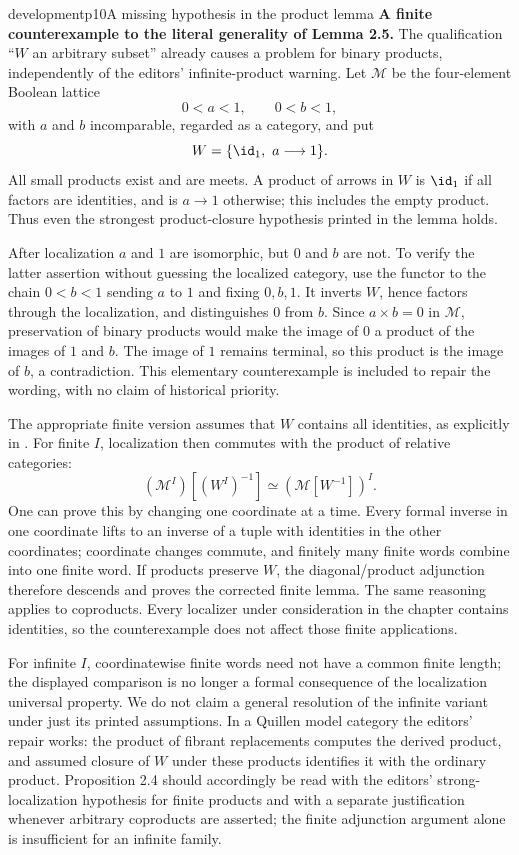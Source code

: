 \begin{dcomment}{development}{p10}{A missing hypothesis in the product lemma}
\textbf{A finite counterexample to the literal generality of Lemma 2.5.}\ours
The qualification ``$W$ an arbitrary subset'' already causes a problem for binary products, independently of the editors' infinite-product warning. Let $\mathcal M$ be the four-element Boolean lattice
\[
0<a<1,\qquad 0<b<1,
\]
with $a$ and $b$ incomparable, regarded as a category, and put
\[
W=\{\id_1,\ a\longrightarrow1\}.
\]
All small products exist and are meets. A product of arrows in $W$ is $\id_1$ if all factors are identities, and is $a\to1$ otherwise; this includes the empty product. Thus even the strongest product-closure hypothesis printed in the lemma holds.

After localization $a$ and $1$ are isomorphic, but $0$ and $b$ are not. To verify the latter assertion without guessing the localized category, use the functor to the chain $0<b<1$ sending $a$ to $1$ and fixing $0,b,1$. It inverts $W$, hence factors through the localization, and distinguishes $0$ from $b$. Since $a\times b=0$ in $\mathcal M$, preservation of binary products would make the image of $0$ a product of the images of $1$ and $b$. The image of $1$ remains terminal, so this product is the image of $b$, a contradiction. This elementary counterexample is included to repair the wording, with no claim of historical priority.

The appropriate finite version assumes that $W$ contains all identities, as explicitly in \citet[Lemma 2.1.7 and Proposition 2.1.8, pp.~114--115]{Maltsiniotis2020}. For finite $I$, localization then commutes with the product of relative categories:
\[
(\mathcal M^I)[(W^I)^{-1}]
 \simeq (\mathcal M[W^{-1}])^I.
\]
One can prove this by changing one coordinate at a time. Every formal inverse in one coordinate lifts to an inverse of a tuple with identities in the other coordinates; coordinate changes commute, and finitely many finite words combine into one finite word. If products preserve $W$, the diagonal/product adjunction therefore descends and proves the corrected finite lemma. The same reasoning applies to coproducts. Every localizer under consideration in the chapter contains identities, so the counterexample does not affect those finite applications.

For infinite $I$, coordinatewise finite words need not have a common finite length; the displayed comparison is no longer a formal consequence of the localization universal property. We do not claim a general resolution of the infinite variant under just its printed assumptions. In a Quillen model category the editors' repair works: the product of fibrant replacements computes the derived product, and assumed closure of $W$ under these products identifies it with the ordinary product. Proposition 2.4 should accordingly be read with the editors' strong-localization hypothesis for finite products and with a separate justification whenever arbitrary coproducts are asserted; the finite adjunction argument alone is insufficient for an infinite family.
\end{dcomment}

